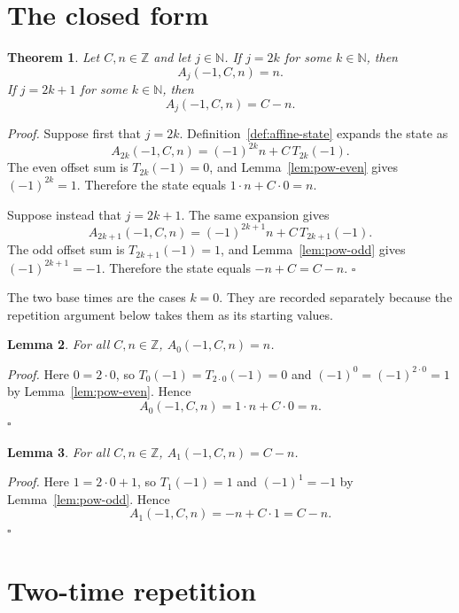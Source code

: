 \documentclass[11pt,letterpaper]{article}
\newcommand{\N}{\mathbb{N}}
\newcommand{\Z}{\mathbb{Z}}
\newtheorem{theorem}{Theorem}
\newtheorem{lemma}[theorem]{Lemma}
\newenvironment{proof}{\noindent\textit{Proof.}}{\hfill\(\square\)}
\begin{document}
\section{The closed form}

\begin{theorem}
\label{thm:reflection-affine}
Let \(C,n\in\Z\) and let \(j\in\N\). If \(j=2k\) for some \(k\in\N\), then
\[
A_j(-1,C,n)=n.
\]
If \(j=2k+1\) for some \(k\in\N\), then
\[
A_j(-1,C,n)=C-n.
\]
\end{theorem}

\begin{proof}
Suppose first that \(j=2k\). Definition~\ref{def:affine-state} expands the
state as
\[
A_{2k}(-1,C,n)=(-1)^{2k}n+C\,T_{2k}(-1).
\]
The even offset sum is \(T_{2k}(-1)=0\), and Lemma~\ref{lem:pow-even} gives
\((-1)^{2k}=1\). Therefore the state equals \(1\cdot n+C\cdot 0=n\).

Suppose instead that \(j=2k+1\). The same expansion gives
\[
A_{2k+1}(-1,C,n)=(-1)^{2k+1}n+C\,T_{2k+1}(-1).
\]
The odd offset sum is \(T_{2k+1}(-1)=1\), and Lemma~\ref{lem:pow-odd} gives
\((-1)^{2k+1}=-1\). Therefore the state equals \(-n+C=C-n\).
\end{proof}

The two base times are the cases \(k=0\). They are recorded separately
because the repetition argument below takes them as its starting values.

\begin{lemma}
\label{lem:time-zero}
For all \(C,n\in\Z\), \(A_0(-1,C,n)=n\).
\end{lemma}

\begin{proof}
Here \(0=2\cdot 0\), so \(T_0(-1)=T_{2\cdot 0}(-1)=0\) and
\((-1)^0=(-1)^{2\cdot 0}=1\) by Lemma~\ref{lem:pow-even}. Hence
\[
A_0(-1,C,n)=1\cdot n+C\cdot 0=n.
\]
\end{proof}

\begin{lemma}
\label{lem:time-one}
For all \(C,n\in\Z\), \(A_1(-1,C,n)=C-n\).
\end{lemma}

\begin{proof}
Here \(1=2\cdot 0+1\), so \(T_1(-1)=1\) and \((-1)^1=-1\) by
Lemma~\ref{lem:pow-odd}. Hence
\[
A_1(-1,C,n)=-n+C\cdot 1=C-n.
\]
\end{proof}

\section{Two-time repetition}
\end{document}
